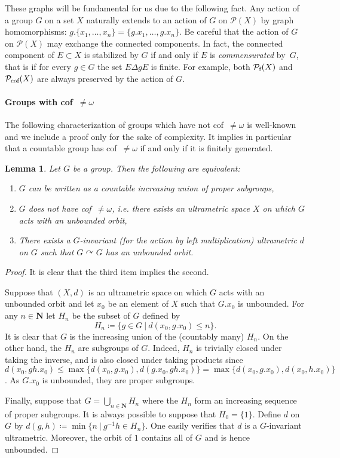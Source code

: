 \documentclass[a4paper]{article}
\newcounter{mycomment}
\newcommand{\mycomment}[2][]{\refstepcounter{mycomment}{\todo[color={green!33},size=\small]{\textbf{Commentaire [\uppercase{#1}\themycomment]:}~#2}}}
\newcommand{\PH}[1]{\todo[color={blue!33},size=small]{#1}}
\newtheorem{lem}{Lemma}[section]
\theoremstyle{definition}
\newcommand*{\field}[1]{\mathbf{#1}}
\newcommand*{\N}{\field{N}}
\newcommand{\setst}[2]{\{#1\ |\ #2\}}
\newcommand*{\powerset}[1]{\mathcal P(#1)}
\newcommand*{\powersetf}[1]{\mathcal P_{\textnormal{f}}(#1)}
\newcommand*{\powersetcof}[1]{\mathcal P_{\textnormal{cof}}(#1)}
\begin{document}
These graphs will be fundamental for us due to the following fact.
Any action of a group $G$ on a set $X$ naturally extends to an action of $G$ on $\powerset{X}$ by graph homomorphisms: $g.\{x_1,\dots,x_n\}=\{g.x_1,\dots,g.x_n\}$.
Be careful that the action of $G$ on $\powerset{X}$ may exchange the connected components.
In fact, the connected component of $E\subset X$ is stabilized by $G$ if and only if $E$ is \emph{commensurated} by~$G$, that is if for every $g\in G$ the set $E\Delta gE$ is finite.
For example, both $\powersetf{X}$ and $\powersetcof{X}$ are always preserved by the action of $G$.

\paragraph{Groups with cof~$\neq\omega$}
The following characterization of groups which have not cof~$\neq\omega$ is well-known and we include a proof only for the sake of complexity.
It implies in particular that a countable group has cof~$\neq\omega$ if and only if it is finitely generated.%
%
%
\begin{lem}\label{Lemma:CofSub}
Let $G$ be a group. Then the following are equivalent:
\begin{enumerate}
\item $G$ can be written as a countable increasing union of proper subgroups,
\item $G$ does not have cof~$\neq\omega$, i.e. there exists an ultrametric space $X$ on which $G$ acts with an unbounded orbit,
\item There exists a $G$-invariant (for the action by left multiplication) ultrametric $d$ on $G$ such that $G\curvearrowright G$ has an unbounded orbit.
\end{enumerate}
\end{lem}
\begin{proof}
It is clear that the third item implies the second.

Suppose that $(X,d)$ is an ultrametric space on which $G$ acts with an unbounded orbit and let $x_0$ be an element of $X$ such that $G.x_0$ is unbounded. For any $n\in \N$ let $H_n$ be the subset of $G$ defined by
\[
	H_n\coloneqq\setst{g\in G}{d(x_0,g.x_0)\leq n}.
\]
It is clear that $G$ is the increasing union of the (countably many) $H_n$.
On the other hand, the $H_n$ are subgroups of $G$. Indeed, $H_n$ is trivially closed under taking the inverse, and is also closed under taking products since $d(x_0,gh.x_0)\leq\max\{d(x_0,g.x_0),d(g.x_0,gh.x_0)\}=\max\{d(x_0,g.x_0),d(x_0,h.x_0)\}$. As $G.x_0$ is unbounded, they are proper subgroups.

Finally, suppose that $G=\bigcup_{n\in \N}H_n$ where the $H_n$ form an increasing sequence of proper subgroups. It is always possible to suppose that $H_0=\{1\}$.
Define $d$ on $G$ by $d(g,h)\coloneqq\min\setst{n}{g^{-1}h\in H_n}$.
One easily verifies that $d$ is a $G$-invariant ultrametric. Moreover, the orbit of $1$ contains all of $G$ and is hence unbounded.
\end{proof}
\end{document}
